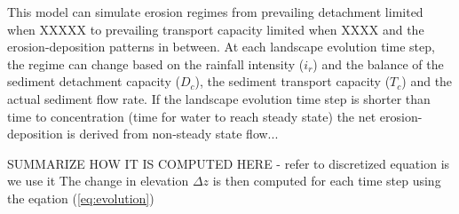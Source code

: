 \documentclass[gmd, manuscript]{copernicus}
\begin{document}


This model can simulate erosion regimes from prevailing detachment limited when XXXXX 
to prevailing transport capacity limited when XXXX and the erosion-deposition patterns in between.
At each landscape evolution time step, the regime can change
based on the rainfall intensity ($i_r$)
and the balance of the sediment detachment capacity ($D_c$),
the sediment transport capacity ($T_c$) and the actual sediment flow rate.
If the landscape evolution time step is shorter than time to concentration (time for water to reach steady state)
the net erosion-deposition is derived from non-steady state flow...

SUMMARIZE HOW IT IS COMPUTED HERE - refer to discretized equation is we use it
The change in elevation $\Delta z$ is then computed for each time step using the eqation (\ref{eq:evolution})
\end{document}
